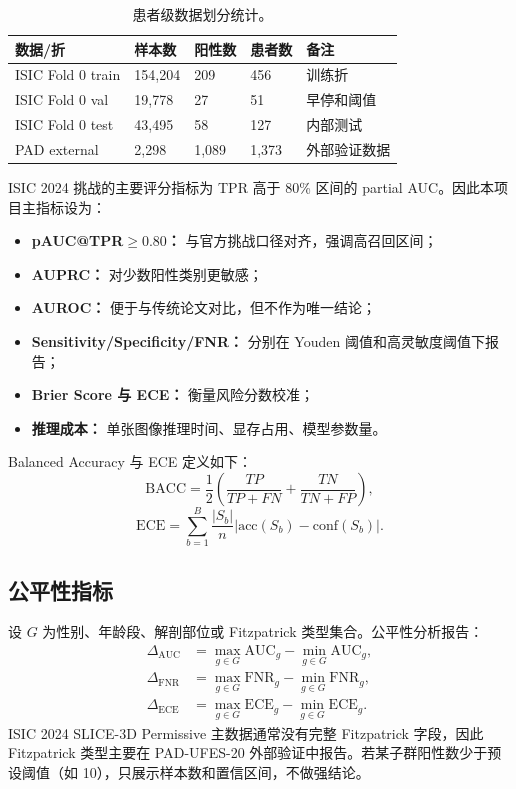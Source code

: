 \documentclass[UTF8,a4paper,10pt,twocolumn,fontset=fandol]{ctexart}
\newcommand{\isic}{ISIC 2024 SLICE-3D Permissive}
\newcommand{\pad}{PAD-UFES-20}
\begin{document}
\begin{table}[H]
\centering
\small
\caption{患者级数据划分统计。}
\label{tab:split}
\begin{tabularx}{\columnwidth}{L{1.4cm}C{1.5cm}C{1.5cm}C{1.5cm}Y}
\toprule
数据/折 & 样本数 & 阳性数 & 患者数 & 备注 \\
\midrule
ISIC Fold 0 train & 154,204 & 209 & 456 & 训练折 \\
ISIC Fold 0 val & 19,778 & 27 & 51 & 早停和阈值 \\
ISIC Fold 0 test & 43,495 & 58 & 127 & 内部测试 \\
PAD external & 2,298 & 1,089 & 1,373 & 外部验证数据\\
\bottomrule
\end{tabularx}
\end{table}

ISIC 2024 挑战的主要评分指标为 TPR 高于 80\% 区间的 partial AUC\cite{kaggleisic2024}。因此本项目主指标设为：
\begin{itemize}
    \item \textbf{pAUC@TPR$\geq0.80$：} 与官方挑战口径对齐，强调高召回区间；
    \item \textbf{AUPRC：} 对少数阳性类别更敏感；
    \item \textbf{AUROC：} 便于与传统论文对比，但不作为唯一结论；
    \item \textbf{Sensitivity/Specificity/FNR：} 分别在 Youden 阈值和高灵敏度阈值下报告；
    \item \textbf{Brier Score 与 ECE：} 衡量风险分数校准；
    \item \textbf{推理成本：} 单张图像推理时间、显存占用、模型参数量。
\end{itemize}
Balanced Accuracy 与 ECE 定义如下：
\begin{equation}
    \mathrm{BACC}=\frac{1}{2}\left(\frac{TP}{TP+FN}+\frac{TN}{TN+FP}\right),
\end{equation}
\begin{equation}
    \mathrm{ECE}=\sum_{b=1}^{B}\frac{|S_b|}{n}\left|\mathrm{acc}(S_b)-\mathrm{conf}(S_b)\right|.
\end{equation}


\subsection{公平性指标}
设 $G$ 为性别、年龄段、解剖部位或 Fitzpatrick 类型集合。公平性分析报告：
\begin{align}
    \Delta_{\mathrm{AUC}} &= \max_{g\in G}\mathrm{AUC}_g - \min_{g\in G}\mathrm{AUC}_g,\\
    \Delta_{\mathrm{FNR}} &= \max_{g\in G}\mathrm{FNR}_g - \min_{g\in G}\mathrm{FNR}_g,\\
    \Delta_{\mathrm{ECE}} &= \max_{g\in G}\mathrm{ECE}_g - \min_{g\in G}\mathrm{ECE}_g.
\end{align}
\isic{} 主数据通常没有完整 Fitzpatrick 字段，因此 Fitzpatrick 类型主要在 \pad{} 外部验证中报告。若某子群阳性数少于预设阈值（如 10），只展示样本数和置信区间，不做强结论。
\end{document}
